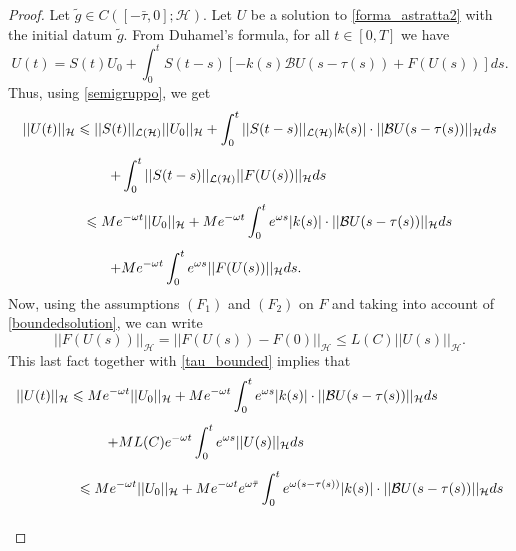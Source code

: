 \documentclass[11pt]{article}
\renewcommand{\leq}{\leqslant}
\begin{document}
\begin{proof}
Let $\tilde{g}\in C([-\bar\tau, 0];\mathcal{H})$. Let $U$ be a solution to \eqref{forma_astratta2} with the initial datum $\tilde{g}$. 
From Duhamel's formula, for all $t\in [0,T]$ we have
$$U(t)=S(t)U_0+\int_0^tS(t-s)[-k(s){\mathcal B}U(s-\tau(s))+F(U(s))]ds.$$ 
Thus, using \eqref{semigruppo}, we get
$$\begin{array}{l}
	\vspace{0.3cm}\displaystyle{||U(t)||_{\mathcal H}\leq ||S(t)||_{\mathcal{L}(\mathcal{H})}||U_0||_{\mathcal H}+\int_0^t||S(t-s)||_{\mathcal{L}(\mathcal{H})}|k(s)|\cdot ||\mathcal{B}U(s-\tau(s))||_{\mathcal H}ds}\\
	\vspace{0.3cm}\displaystyle{\hspace{2.2cm}+\int_0^t||S(t-s)||_{\mathcal{L}(\mathcal{H})} ||F(U(s))||_{\mathcal H}ds}\\
	\vspace{0.3cm}\displaystyle{\hspace{1.6cm}\leq Me^{-\omega t}||U_0||_{\mathcal H}+Me^{-\omega t}\int_0^te^{\omega s}|k(s)|\cdot ||\mathcal{B}U(s-\tau(s))||_{\mathcal H}ds}\\
	\displaystyle{\hspace{2.2cm}+Me^{-\omega t}\int_0^te^{\omega s}||F(U(s))||_{\mathcal H}ds.}
\end{array}$$ 
Now, using the assumptions $(F_1)$ and $(F_2)$ on $F$ and taking into account of \eqref{boundedsolution}, we can write $$||F(U(s))||_{\mathcal H}=||F(U(s))-F(0)||_{\mathcal H}\leq L(C)||U(s)||_{\mathcal H}.$$
This last fact together with \eqref{tau_bounded} implies that
\begin{equation}\label{1}
\begin{array}{l}
\vspace{0.3cm}\displaystyle{ ||U(t)||_{\mathcal H}\leq Me^{-\omega t}||U_0||_{\mathcal H}+Me^{-\omega t} \int_0^t e^{\omega s} |k(s)|\cdot ||\mathcal{B}U(s-\tau(s))||_{\mathcal H}ds  } \\
\vspace{0.3cm}
\displaystyle{ \hspace{2.3 cm}+ML(C)e^{-\omega t} \int_0^t e^{\omega s} ||U(s)||_{\mathcal H} ds}\\
\vspace{0.3cm}\displaystyle{\hspace{1.6 cm} \leq Me^{-\omega t}||U_0||_{\mathcal H}+Me^{-\omega t} e^{\omega\bar{\tau}}\int_0^t e^{\omega (s-\tau(s))} |k(s)|\cdot ||\mathcal{B}U(s-\tau(s))||_{\mathcal H}ds }\\

\end{array}
\end{equation}
\end{proof}
\end{document}
